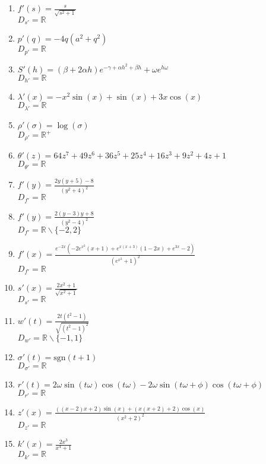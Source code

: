 \documentclass[11pt,answers]{exam}
\begin{document}
\begin{questions}
\begin{solution}
\begin{enumerate}
\item $f'(s)=\frac{s}{\sqrt{s^2+1}}$\\ $D_{s'}=\mathbb{R}$
\item $p'(q)=-4 q \left(a^2+q^2\right)$\\ $D_{p'}=\mathbb{R}$
\item $S'(h)=(\beta +2 \alpha  h) e^{-\gamma +\alpha  h^2+\beta  h}+\omega  e^{h \omega }$\\ $D_{h'}=\mathbb{R}$
\item $\lambda'(x)=-x^2\sin (x)+\sin (x)+3 x \cos (x)$\\ $D_{\lambda'}=\mathbb{R}$
\item $\rho'(\sigma)=\log (\sigma )$\\ $D_{\rho'}=\mathbb{R}^+$
\item $\theta'(z)=64 z^7+49 z^6+36 z^5+25 z^4+16 z^3+9 z^2+4 z+1$
\\ $D_{\theta'}=\mathbb{R}$
\item $f'(y)=\frac{2 y (y+5)-8}{\left(y^2+4\right)^2}$\\ $D_{f'}=\mathbb{R}$
\item $f'(y)=\frac{2 (y-3) y+8}{\left(y^2-4\right)^2}$\\ 
$D_{f'}=\mathbb{R}\backslash\{-2,2\}$
\item $f'(x)=\frac{e^{-2 x} \left(-2 e^{x^2} (x+1)+e^{x (x+3)} (1-2 x)+e^{3
   x}-2\right)}{\left(e^{x^2}+1\right)^2}$\\ $D_{f'}=\mathbb{R}$
\item $s'(x)=\frac{2 x^2+1}{\sqrt{x^2+1}}$\\ $D_{s'}=\mathbb{R}$
\item $w'(t)=\frac{2 t \left(t^2-1\right)}{\sqrt{\left(t^2-1\right)^2}}$\\ 
$D_{w'}=\mathbb{R}\backslash\{-1,1\}$
\item $\sigma'(t)=\text{sgn}(t+1)$\\ $D_{\sigma'}=\mathbb{R}$
\item $r'(t)=2 \omega  \sin (t \omega ) \cos (t \omega )-2 \omega  
\sin (t \omega +\phi ) \cos (t \omega+\phi )$\\ $D_{r'}=\mathbb{R}$
\item $z'(x)=\frac{((x-2) x+2) \sin (x)+(x (x+2)+2) \cos (x)}{\left(x^2+2\right)^2}$\\ $D_{z'}=\mathbb{R}$

\item $k'(x)=\frac{2 x^3}{x^4+1}$\\ $D_{k'}=\mathbb{R}$


\end{enumerate}
\end{solution}
\end{questions}
\end{document}
